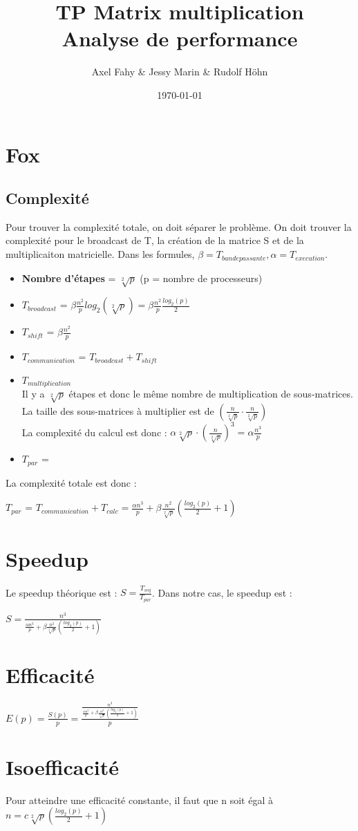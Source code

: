 \documentclass[a4paper]{article}
\title{TP Matrix multiplication\\Analyse de performance}
\author{Axel Fahy \& Jessy Marin \& Rudolf Höhn}
\date{\today}
\begin{document}
\maketitle

\section{Fox}

\subsection{Complexité}
Pour trouver la complexité totale, on doit séparer le problème. On doit trouver la complexité pour le broadcast de T, la création de la matrice S et de la multiplicaiton matricielle.
Dans les formules, $\beta = T_{bande passante}, \alpha = T_{execution}$.
\begin{itemize}
    \item \textbf{Nombre d'étapes} = $\sqrt[2]{p}$ (p = nombre de processeurs)
    \item \textbf{\boldmath$T_{broadcast}$} = $\beta \frac{n^2}{p} log_2(\sqrt[2]{p}) = \beta \frac{n^2}{p} \frac{log_2(p)}{2}$
    \item \textbf{\boldmath$T_{shift}$} = $\beta \frac{n^2}{p}$
    \item \textbf{\boldmath$T_{communication}$} = $T_{broadcast} + T_{shift}$
    \item \textbf{\boldmath$T_{multiplication}$}\\
    Il y a $\sqrt[2]{p}$ étapes et donc le même nombre de multiplication de sous-matrices.\\
    La taille des sous-matrices à multiplier est de $(\frac{n}{\sqrt[2]{p}} \cdot \frac{n}{\sqrt[2]{p}})$\\
    La complexité du calcul est donc : $\alpha \sqrt[2]{p} \cdot (\frac{n}{\sqrt[2]{p}})^3 = \alpha \frac{n^3}{p}$
\item \textbf{\boldmath$T_{par}$} =
\end{itemize}

La complexité totale est donc :
\begin{center}
\textbf{\boldmath$T_{par}$} = $T_{communication} + T_{calc} = \frac{\alpha n^3}{p} + \beta \frac{n^2}{\sqrt[2]{p}}(\frac{log_2(p)}{2} + 1)$
\end{center}

\section{Speedup}
Le speedup théorique est : $S = \frac{T_{seq}}{T_{par}}$. Dans notre cas, le speedup est :
\begin{center}
    $S=\frac{n^3}{\frac{\alpha n^3}{p} + \beta \frac{n^2}{\sqrt[2]{p}}(\frac{log_2(p)}{2} + 1)}$
\end{center}
\section{Efficacité}
$E(p) = \frac{S(p)}{p} = \frac{\frac{n^3}{\frac{\alpha n^3}{p} + \beta \frac{n^2}{\sqrt[2]{p}}(\frac{log_2(p)}{2} + 1)}}{p}$
\section{Isoefficacité}
Pour atteindre une efficacité constante, il faut que n soit égal à $n = c\sqrt[2]{p} (\frac{log_2(p)}{2} + 1)$
\end{document}
